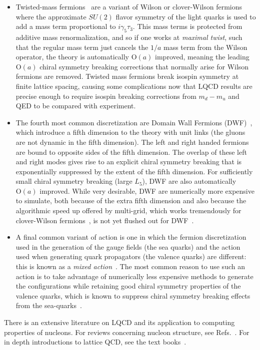 \begin{itemize}[leftmargin=*]
\item Twisted-mass fermions~ are a variant of Wilson or clover-Wilson fermions where the approximate $SU(2)$ flavor symmetry of the light quarks is used to add a mass term proportional to $i\gamma_5 \tau_3$.  This mass terms is protected from additive mass renormalization, and so if one works at \textit{maximal twist}, such that the regular mass term just cancels the $1/a$ mass term from the Wilson operator, the theory is automatically $\mathrm{O}(a)$ improved, meaning the leading $\mathrm{O}(a)$ chiral symmetry breaking corrections that normally arise for Wilson fermions are removed.
Twisted mass fermions break isospin symmetry at finite lattice spacing, causing some complications now that LQCD results are precise enough to require isospin breaking corrections from $m_d-m_u$ and QED to be compared with experiment.

\item The fourth most common discretization are Domain Wall Fermions (DWF)~\addcite{}, which introduce a fifth dimension to the theory with unit links (the gluons are not dynamic in the fifth dimension).  The left and right handed fermions are bound to opposite sides of the fifth dimension.  The overlap of these left and right modes gives rise to an explicit chiral symmetry breaking that is exponentially suppressed by the extent of the fifth dimension.  For sufficiently small chiral symmetry breaking (large $L_5$), DWF are also automatically $\mathrm{O}(a)$ improved.
While very desirable, DWF are numerically more expensive to simulate, both because of the extra fifth dimension and also because the algorithmic speed up offered by multi-grid, which works tremendously for clover-Wilson fermions~, is not yet flushed out for DWF~.

\item A final common variant of action is one in which the fermion discretization used in the generation of the gauge fields (the sea quarks) and the action used when generating quark propagators (the valence quarks) are different: this is known as a \textit{mixed action}~\cite{Renner:2004ck}.
The most common reason to use such an action is to take advantage of numerically less expensive methods to generate the configurations while retaining good chiral symmetry properties of the valence quarks, which is known to suppress chiral symmetry breaking effects from the sea-quarks~\cite{Bar:2002nr,Bar:2005tu,Tiburzi:2005is,Chen:2007ug}.


\end{itemize}
There is an extensive literature on LQCD and its application to computing properties of nucleons.
For reviews concerning nucleon structure, see Refs.~\addcite{}.
For in depth introductions to lattice QCD, see the text books~\cite{Smit:2002ug,DeGrand:2006zz,Gattringer:2010zz}.






